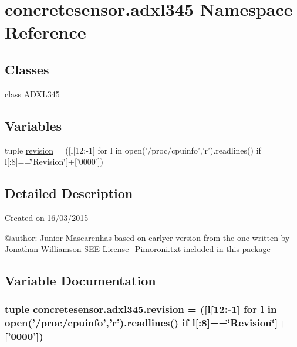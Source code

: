 \hypertarget{namespaceconcretesensor_1_1adxl345}{}\section{concretesensor.\+adxl345 Namespace Reference}
\label{namespaceconcretesensor_1_1adxl345}
\subsection*{Classes}
\begin{DoxyCompactItemize}
\item 
class \hyperlink{classconcretesensor_1_1adxl345_1_1ADXL345}{A\+D\+X\+L345}
\end{DoxyCompactItemize}
\subsection*{Variables}
\begin{DoxyCompactItemize}
\item 
tuple \hyperlink{namespaceconcretesensor_1_1adxl345_a02e8c4bf0550b3ac6e739c6c01493313}{revision} = (\mbox{[}l\mbox{[}12\+:-\/1\mbox{]} for l in open('/proc/cpuinfo','r').readlines() if l\mbox{[}\+:8\mbox{]}==\char`\"{}Revision\char`\"{}\mbox{]}+\mbox{[}'0000'\mbox{]})
\end{DoxyCompactItemize}


\subsection{Detailed Description}
\begin{DoxyVerb}Created on 16/03/2015

@author: Junior Mascarenhas
based on earlyer version from
the one written by Jonathan Williamson
SEE License_Pimoroni.txt included in this package
\end{DoxyVerb}
 

\subsection{Variable Documentation}
\hypertarget{namespaceconcretesensor_1_1adxl345_a02e8c4bf0550b3ac6e739c6c01493313}{}
\subsubsection[{revision}]{\setlength{\rightskip}{0pt plus 5cm}tuple concretesensor.\+adxl345.\+revision = (\mbox{[}l\mbox{[}12\+:-\/1\mbox{]} for l in open('/proc/cpuinfo','r').readlines() if l\mbox{[}\+:8\mbox{]}==\char`\"{}Revision\char`\"{}\mbox{]}+\mbox{[}'0000'\mbox{]})}\label{namespaceconcretesensor_1_1adxl345_a02e8c4bf0550b3ac6e739c6c01493313}
